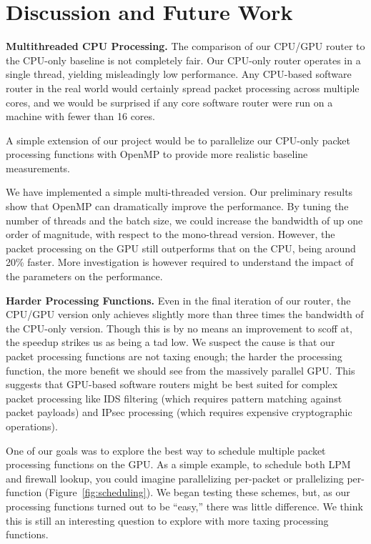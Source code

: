 \section{Discussion and Future Work}
\label{sec:disc}

\noindent \textbf{Multithreaded CPU Processing.} The comparison of our CPU/GPU
router to the CPU-only baseline is not completely fair. Our CPU-only router
operates in a single thread, yielding misleadingly low performance. Any
CPU-based software router in the real world would certainly spread packet
processing across multiple cores, and we would be surprised if any core
software router were run on a machine with fewer than 16 cores.

A simple extension of our project would be to parallelize our CPU-only packet
processing functions with OpenMP to provide more realistic baseline
measurements.

We have implemented a simple multi-threaded version. Our preliminary results show that OpenMP can dramatically improve the performance. By tuning the number of threads and the batch size, we could increase the bandwidth of up one order of magnitude, with respect to the mono-thread version. However, the packet processing on the GPU still outperforms that on the CPU, being around 20\% faster. More investigation is however required to understand the impact of the parameters on the performance.

\medskip \noindent \textbf{Harder Processing Functions.} Even in the final
iteration of our router, the CPU/GPU version only achieves slightly more than
three times the bandwidth of the CPU-only version. Though this is by no means
an improvement to scoff at, the speedup strikes us as being a tad low. We
suspect the cause is that our packet processing functions are not taxing
enough; the harder the processing function, the more benefit we should see from
the massively parallel GPU. This suggests that GPU-based software routers might
be best suited for complex packet processing like IDS filtering (which requires
pattern matching against packet payloads) and IPsec processing (which requires
expensive cryptographic operations).

One of our goals was to explore the best way to schedule multiple packet
processing functions on the GPU. As a simple example, to schedule both LPM and
firewall lookup, you could imagine parallelizing per-packet or prallelizing
per-function (Figure~\ref{fig:scheduling}). We began testing these schemes,
but, as our processing functions turned out to be ``easy,'' there was little
difference. We think this is still an interesting question to explore with more
taxing processing functions.


